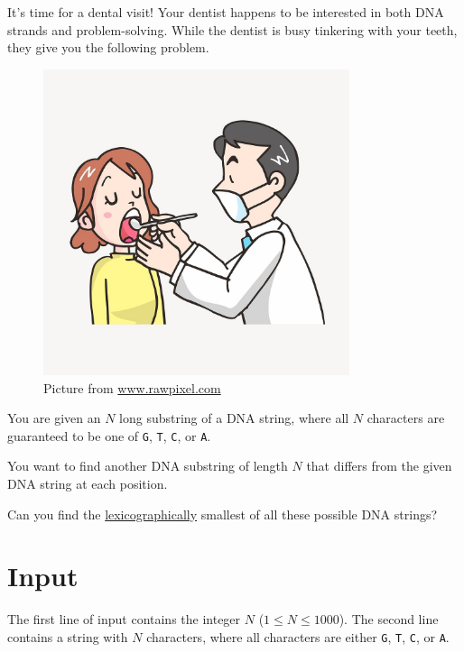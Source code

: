 \noindent

It's time for a dental visit! 
Your dentist happens to be interested in both DNA strands and problem-solving. 
While the dentist is busy tinkering with your teeth, they give you the following problem.

\begin{centering}
    \begin{figure}[h]
        \centering
        \includegraphics[width=0.8\textwidth]{gapastort.jpg}
        \caption{Picture from \href{https://www.rawpixel.com/image/7661670/vector-cartoon-illustrations-public-domain}{www.rawpixel.com}}
    \end{figure}
\end{centering}


You are given an $N$ long substring of a DNA string, where all $N$ characters are guaranteed to be one of \texttt{G}, \texttt{T}, \texttt{C}, or \texttt{A}.

You want to find another DNA substring of length $N$ that differs from the given DNA string at each position.

Can you find the \href{https://en.wikipedia.org/wiki/Lexicographic_order}{lexicographically} smallest of all these possible DNA strings?


\section*{Input}
\noindent
The first line of input contains the integer $N$ ($1 \leq N \leq 1000$).
\noindent
The second line contains a string with $N$ characters, where all characters are either \texttt{G}, \texttt{T}, \texttt{C}, or \texttt{A}.

